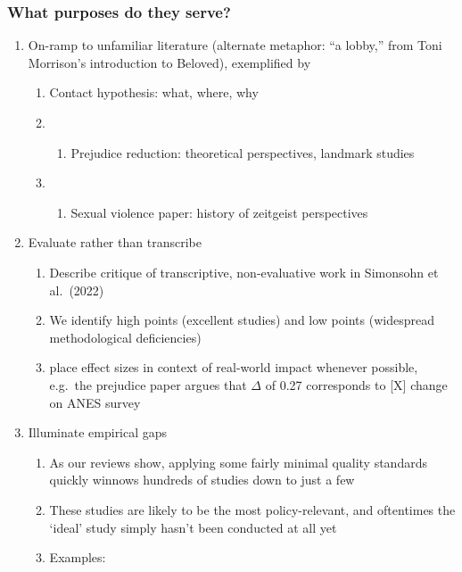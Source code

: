 \documentclass[
  man]{apa6}
\providecommand{\tightlist}{%
  \setlength{\itemsep}{0pt}\setlength{\parskip}{0pt}}
\begin{document}
\subsubsection{What purposes do they serve?}\label{what-purposes-do-they-serve}

\begin{enumerate}
\def\labelenumi{\arabic{enumi}.}
\tightlist
\item
  On-ramp to unfamiliar literature (alternate metaphor: ``a lobby,'' from Toni Morrison's introduction to Beloved), exemplified by

  \begin{enumerate}
  \def\labelenumii{\arabic{enumii}.}
  \tightlist
  \item
    Contact hypothesis: what, where, why
  \item
    \begin{enumerate}
    \def\labelenumiii{\roman{enumiii}.}
    \setcounter{enumiii}{2}
    \tightlist
    \item
      Prejudice reduction: theoretical perspectives, landmark studies
    \end{enumerate}
  \item
    \begin{enumerate}
    \def\labelenumiii{\roman{enumiii}.}
    \setcounter{enumiii}{3}
    \tightlist
    \item
      Sexual violence paper: history of zeitgeist perspectives
    \end{enumerate}
  \end{enumerate}
\item
  Evaluate rather than transcribe

  \begin{enumerate}
  \def\labelenumii{\arabic{enumii}.}
  \setcounter{enumii}{3}
  \tightlist
  \item
    Describe critique of transcriptive, non-evaluative work in Simonsohn et al.~(2022)
  \item
    We identify high points (excellent studies) and low points (widespread methodological deficiencies)
  \item
    place effect sizes in context of real-world impact whenever possible, e.g.~the prejudice paper argues that \(\Delta\) of 0.27 corresponds to {[}X{]} change on ANES survey
  \end{enumerate}
\item
  Illuminate empirical gaps

  \begin{enumerate}
  \def\labelenumii{\arabic{enumii}.}
  \setcounter{enumii}{6}
  \tightlist
  \item
    As our reviews show, applying some fairly minimal quality standards quickly winnows hundreds of studies down to just a few
  \item
    These studies are likely to be the most policy-relevant, and oftentimes the `ideal' study simply hasn't been conducted at all yet
  \item
    Examples:


\end{enumerate}
\end{enumerate}
\end{document}
